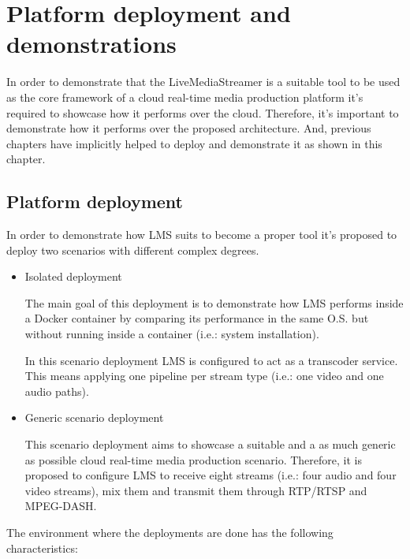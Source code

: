 \chapter{Platform deployment and demonstrations}\label{H:platformDeploymentAndDemonstrations}

In order to demonstrate that the LiveMediaStreamer is a suitable tool to be used as the core framework of a cloud real-time media production platform it's required to showcase how it performs over the cloud. Therefore, it's important to demonstrate how it performs over the proposed architecture. And, previous chapters have implicitly helped to deploy and demonstrate it as shown in this chapter.

\section{Platform deployment}

In order to demonstrate how LMS suits to become a proper tool it's proposed to deploy two scenarios with different complex degrees.

\begin{itemize}
\item Isolated deployment \hfill

The main goal of this deployment is to demonstrate how LMS performs inside a Docker container by comparing its performance in the same O.S. but without running inside a container (i.e.: system installation).

In this scenario deployment LMS is configured to act as a transcoder service. This means applying one pipeline per stream type (i.e.: one video and one audio paths).

\item Generic scenario deployment \hfill

This scenario deployment aims to showcase a suitable and a as much generic as possible cloud real-time media production scenario. Therefore, it is proposed to configure LMS to receive eight streams (i.e.: four audio and four video streams), mix them and transmit them through RTP/RTSP and MPEG-DASH. 
\end{itemize}

The environment where the deployments are done has the following characteristics:

